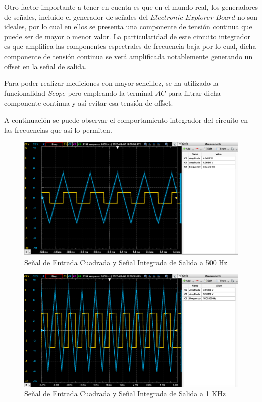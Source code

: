 Otro factor importante a tener en cuenta es que en el mundo real, los generadores de señales, incluido el generador de señales del $Electronic$ $Explorer$ $Board$ no son ideales,
por lo cual en ellos se presenta una componente de tensión continua que puede ser de mayor o menor valor. La particularidad de este circuito integrador es que amplifica las componentes 
espectrales de frecuencia baja por lo cual, dicha componente de tensión continua se verá amplificada notablemente generando un offset en la señal de salida.

Para poder realizar mediciones con mayor sencillez, se ha utilizado la funcionalidad $Scope$ pero empleando la terminal $AC$ para filtrar dicha componente continua y así evitar
esa tensión de offset. 


A continuación se puede observar el comportamiento integrador del circuito en las frecuencias que así lo permiten.

\begin{figure}[H]
    \centering 
    \includegraphics [scale=0.4] {../Ejercicio3-CircuitoIntegradoresyDerivadores/Imagenes/cuadrada-500.png} 
    \caption{Señal de Entrada Cuadrada y Señal Integrada de Salida a 500 Hz }
    \label{fig:emptyPlotTool}
\end{figure}

\begin{figure}[H]
    \centering 
    \includegraphics [scale=0.4] {../Ejercicio3-CircuitoIntegradoresyDerivadores/Imagenes/cuadrada-1000.png} 
    \caption{Señal de Entrada Cuadrada y Señal Integrada de Salida a 1 KHz }
    \label{fig:emptyPlotTool}
\end{figure}

